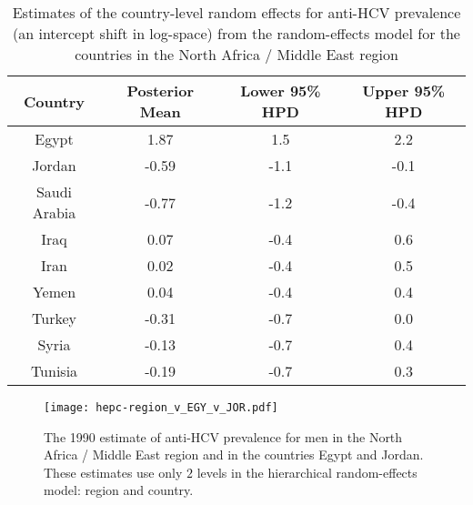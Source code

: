     \begin{table}[h]
        \begin{center}
        \begin{tabular}{|c|c|c|c|}
            \hline
                Country & Posterior Mean & Lower 95\% HPD  & Upper 95\%  HPD \\
            \hline
                Egypt	&	1.87	&	 1.5	&	2.2	\\
                Jordan	&	-0.59	&	-1.1	&	-0.1 \\
                Saudi Arabia	&	-0.77	&	-1.2	&	-0.4 \\
                Iraq	&	0.07	&	-0.4	&	0.6	\\
                Iran	&	0.02	&	-0.4	&	0.5	\\
                Yemen	&	0.04	&	-0.4	&	0.4	\\
                Turkey	&	-0.31	&	-0.7	&	0.0	\\
                Syria	&	-0.13	&	-0.7	&	0.4	\\
                Tunisia	&	-0.19	&	-0.7	&	0.3	\\
            \hline
        \end{tabular}
        \end{center}
        \caption{ Estimates of the country-level random effects for anti-HCV
          prevalence (an intercept shift in log-space) from the random-effects
          model for the countries in the North Africa / Middle
          East region}
        \label{tab:app-hepc regional rfx}
    \end{table}

    \begin{figure}[h]
        \begin{center}
            \texttt{[image: hepc-region\_v\_EGY\_v\_JOR.pdf]}
            \caption[Estimates of anti-HCV prevalence in North Africa / Middle East 
              region and in the countries Egypt and Jordan.]{The 1990 estimate of 
              anti-HCV prevalence for
              men in the North Africa / Middle East region and in
              the countries Egypt and Jordan.  These estimates
              use only $2$ levels in the hierarchical random-effects
              model: region and country.}
            \label{fig:app-hepc regional rfx}
        \end{center}
    \end{figure}

